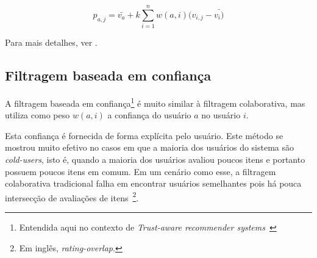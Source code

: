 \begin{equation}
 p_{a,j} = \bar{v_{a}} + k\sum_{i=1}^n{w(a,i) (v_{i,j} - \bar{v_{i})}}
 \label{eq:filtragem_colaborativa_geral} 
\end{equation}

Para mais detalhes, ver \cite{Breese98}.


\subsection{Filtragem baseada em confiança} %

A filtragem baseada em confiança\footnote{Entendida aqui no contexto de \textit{Trust-aware recommender systems}~\cite{Massa07}} é muito similar à filtragem colaborativa, mas utiliza como peso $w(a,i)$ a confiança do usuário $a$ no usuário $i$.

Esta confiança é fornecida de forma explícita pelo usuário. Este método se mostrou muito efetivo no casos em que a maioria dos usuários do sistema são \textit{cold-users}, isto é, quando a maioria dos usuários avaliou poucos itens e portanto possuem poucos itens em comum. Em um cenário como esse, a filtragem colaborativa tradicional falha em encontrar usuários semelhantes pois há pouca intersecção de avaliações de itens~\footnote{Em inglês, \textit{rating-overlap}.}.




